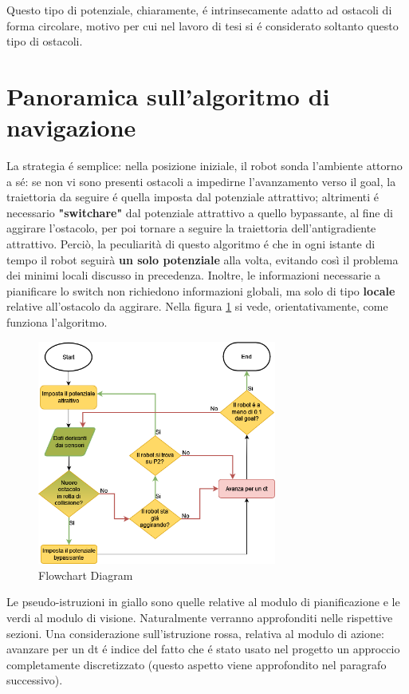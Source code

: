 \documentclass[14pt,a4paper]{extarticle}
\begin{document}
Questo tipo di potenziale, chiaramente, é intrinsecamente adatto ad ostacoli di forma circolare, motivo per cui nel lavoro di tesi si é considerato soltanto questo tipo di ostacoli.

\section{Panoramica sull'algoritmo di navigazione} 
La strategia é semplice: nella posizione iniziale, il robot sonda l'ambiente attorno a sé: se non vi sono presenti ostacoli a impedirne l'avanzamento verso il goal, la traiettoria da seguire é quella imposta dal potenziale attrattivo; altrimenti é necessario \textbf{"switchare"} dal potenziale attrattivo a quello bypassante, al fine di aggirare l'ostacolo, per poi tornare a seguire la traiettoria dell'antigradiente attrattivo. Perciò, la peculiarità di questo algoritmo é che in ogni istante di tempo il robot seguirà \textbf{un solo potenziale} alla volta, evitando così il problema dei minimi locali discusso in precedenza. Inoltre, le informazioni necessarie a pianificare lo switch non richiedono informazioni globali, ma solo di tipo \textbf{locale} relative all'ostacolo da aggirare. Nella figura \ref{flow} si vede, orientativamente, come funziona l'algoritmo. 

\begin{figure}[H]
\caption{Flowchart Diagram} \label{flow}
\centering
\includegraphics[width=0.7\textwidth]{flowchart.png}
\end{figure}

Le pseudo-istruzioni in giallo sono quelle relative al modulo di pianificazione e le verdi al modulo di visione. Naturalmente verranno approfonditi nelle rispettive sezioni. Una considerazione sull'istruzione rossa, relativa al modulo di azione: avanzare per un dt é indice del fatto che é stato usato nel progetto un approccio completamente discretizzato (questo aspetto viene approfondito nel paragrafo successivo).
\end{document}
